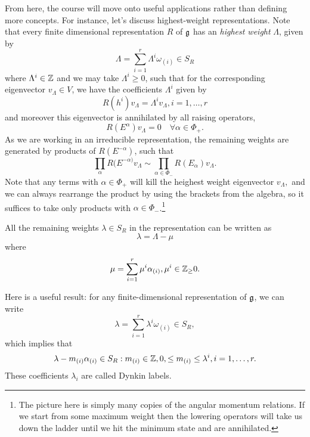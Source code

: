 From here, the course will move onto useful applications rather than defining more concepts. For instance, let's discuss highest-weight representations. Note that every finite dimensional representation $R$ of $\mathfrak{g}$ has an \emph{highest weight} $\Lambda$, given by
$$\Lambda=\sum_{i=1}^r \Lambda^i \omega_{(i)} \in S_R$$
where $\Lambda^i\in \mathbb{Z}$ and we may take $\Lambda^i\geq 0$, such that for the corresponding eigenvector $v_\Lambda \in V$, we have the coefficients $\Lambda^i$ given by
$$R(h^i)v_\Lambda = \Lambda^i v_\Lambda, i=1,\ldots,r$$
and moreover this eigenvector is annihilated by all raising operators,
$$R(E^\alpha)v_\Lambda=0 \quad\forall \alpha\in \Phi_+.$$
As we are working in an irreducible representation, the remaining weights are generated by products of $R(E^{-\alpha})$, such that
$$\prod_{\alpha}R(E^{-\alpha)}v_\Lambda \sim \prod_{\alpha\in \Phi_-}R(E_\alpha) v_\Lambda.$$
Note that any terms with $\alpha\in \Phi_+$ will kill the heighest weight eigenvector $v_\Lambda,$ and we can always rearrange the product by using the brackets from the algebra, so it suffices to take only products with $\alpha\in \Phi_-$.\footnote{The picture here is simply many copies of the angular momentum relations. If we start from some maximum weight then the lowering operators will take us down the ladder until we hit the minimum state and are annihilated.}

All the remaining weights $\lambda\in S_R$ in the representation can be written as
$$\lambda=\Lambda-\mu$$
where $$\mu=\sum_{i=1}^r \mu^i \alpha_{(i)}, \mu^i \in \mathbb{Z}_\geq 0.$$

Here is a useful result: for any finite-dimensional representation of $\mathfrak{g}$, we can write
$$\lambda=\sum_{i=1}^r \lambda^i \omega_{(i)}\in S_R,$$
which implies that
$$\lambda-m_{(i)}\alpha_{(i)} \in S_R: m_{(i)}\in \mathbb{Z}, 0,\leq m_{(i)}\leq \lambda^i, i=1,\ldots,r.$$
These coefficients $\lambda_i$ are called Dynkin labels.